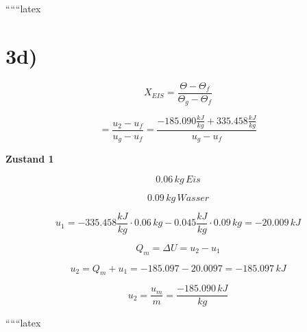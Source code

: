 ``````latex


\section*{3d)}

\begin{equation*}
    X_{EIS} = \frac{\Theta - \Theta_f}{\Theta_g - \Theta_f}
\end{equation*}

\begin{equation*}
    = \frac{u_2 - u_f}{u_g - u_f} = \frac{-185.090 \frac{kJ}{kg} + 335.458 \frac{kJ}{kg}}{u_g - u_f}
\end{equation*}

\textbf{Zustand 1}

\begin{equation*}
    0.06 \, kg \, Eis
\end{equation*}

\begin{equation*}
    0.09 \, kg \, Wasser
\end{equation*}

\begin{equation*}
    u_1 = -335.458 \frac{kJ}{kg} \cdot 0.06 \, kg - 0.045 \frac{kJ}{kg} \cdot 0.09 \, kg = -20.009 \, kJ
\end{equation*}

\begin{equation*}
    Q_m = \Delta U = u_2 - u_1
\end{equation*}

\begin{equation*}
    u_2 = Q_m + u_1 = -185.097 - 20.0097 = -185.097 \, kJ
\end{equation*}

\begin{equation*}
    u_2 = \frac{u_m}{m} = \frac{-185.090 \, kJ}{kg}
\end{equation*}

``````latex


